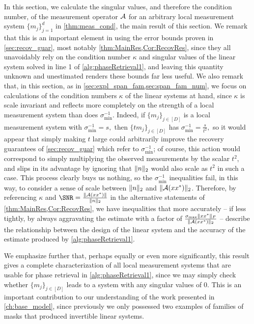 In this section, we calculate the singular values, and therefore the condition number, of the measurement operator $\mathcal{A}$ for an arbitrary local measurement system $\{m_j\}_{j = 1}^d$ in \cref{thm:meas_cond}, the main result of this section.  We remark that this is an important element in using the error bounds proven in \cref{sec:recov_guar}, most notably \cref{thm:MainRes,Cor:RecovRes}, since they all unavoidably rely on the condition number $\kappa$ and singular values of the linear system solved in line 1 of \cref{alg:phaseRetrieval1}, and leaving this quantity unknown and unestimated renders these bounds far less useful.  We also remark that, in this section, as in \cref{sec:expl_span_fam,sec:span_fam_num}, we focus on calculations of the condition numbers $\kappa$ of the linear systems at hand, since $\kappa$ is scale invariant and reflects more completely on the strength of a local measurement system than does $\sigma_{\min}^{-1}$.  Indeed, if $\{m_j\}_{j \in [D]}$ is a local measurement system with $\sigma_{\min}^{-1} = s,$ then $\{t m_j\}_{j \in [D]}$ has $\sigma_{\min}^{-1} = \frac{s}{t^2},$ so it would appear that simply making $t$ large could arbitrarily improve the recovery guarantees of \cref{sec:recov_guar} which refer to $\sigma_{\min}^{-1}$; of course, this action would correspond to simply multiplying the observed measurements by the scalar $t^2$, and slips in its advantage by ignoring that $\lVert n\rVert_2$ would also scale as $t^2$ in such a case.  This process clearly buys us nothing, so the $\sigma_{\min}^{-1}$ inequalities fail, in this way, to consider a sense of scale between $\lVert n\rVert_2$ and $\lVert\mathcal{A}(x x^*)\rVert_2$.  Therefore, by referencing $\kappa$ and $\SNR = \frac{\norm{\Ac(x x^*)}}{\norm{n}_2}$ in the alternative statements of \cref{thm:MainRes,Cor:RecovRes}, we have inequalities that more accurately -- if less tightly, by always aggravating the estimate with a factor of $\frac{\sigma_{\max} \lVert x x^*\rVert_F}{\lVert\mathcal{A}(x x^*)\rVert_2}$ -- describe the relationship between the design of the linear system and the accuracy of the estimate produced by \cref{alg:phaseRetrieval1}.

We emphasize further that, perhaps equally or even more significantly, this result gives a complete characterization of all local measurement systems that are usable for phase retrieval in \cref{alg:phaseRetrieval1}, since we may simply check whether $\{m_j\}_{j \in [D]}$ leads to a system with any singular values of $0$.  This is an important contribution to our understanding of the work presented in \cref{ch:base_model}, since previously we only possessed two examples of families of masks that produced invertible linear systems.



